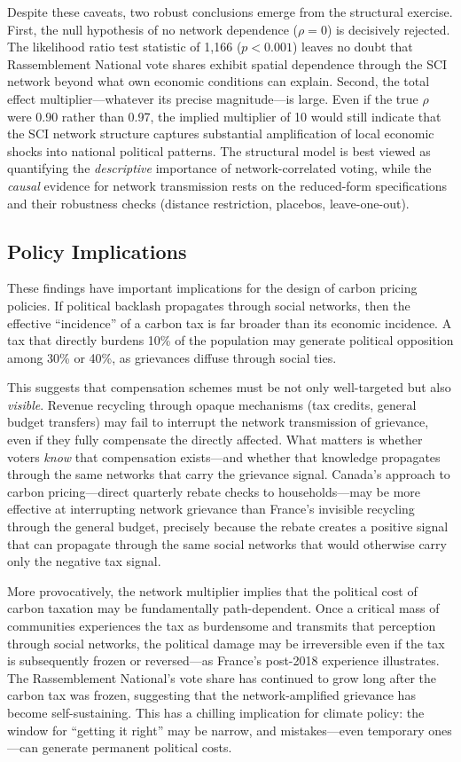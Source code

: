 \documentclass[12pt]{article}
\newcommand{\rn}{Rassemblement National}
\begin{document}
Despite these caveats, two robust conclusions emerge from the structural exercise. First, the null hypothesis of no network dependence ($\rho = 0$) is decisively rejected. The likelihood ratio test statistic of 1{,}166 ($p < 0.001$) leaves no doubt that \rn{} vote shares exhibit spatial dependence through the SCI network beyond what own economic conditions can explain. Second, the total effect multiplier---whatever its precise magnitude---is large. Even if the true $\rho$ were 0.90 rather than 0.97, the implied multiplier of 10 would still indicate that the SCI network structure captures substantial amplification of local economic shocks into national political patterns. The structural model is best viewed as quantifying the \textit{descriptive} importance of network-correlated voting, while the \textit{causal} evidence for network transmission rests on the reduced-form specifications and their robustness checks (distance restriction, placebos, leave-one-out).

\subsection{Policy Implications}

These findings have important implications for the design of carbon pricing policies. If political backlash propagates through social networks, then the effective ``incidence'' of a carbon tax is far broader than its economic incidence. A tax that directly burdens 10\% of the population may generate political opposition among 30\% or 40\%, as grievances diffuse through social ties.

This suggests that compensation schemes must be not only well-targeted but also \textit{visible}. Revenue recycling through opaque mechanisms (tax credits, general budget transfers) may fail to interrupt the network transmission of grievance, even if they fully compensate the directly affected. What matters is whether voters \textit{know} that compensation exists---and whether that knowledge propagates through the same networks that carry the grievance signal. Canada's approach to carbon pricing---direct quarterly rebate checks to households---may be more effective at interrupting network grievance than France's invisible recycling through the general budget, precisely because the rebate creates a positive signal that can propagate through the same social networks that would otherwise carry only the negative tax signal.

More provocatively, the network multiplier implies that the political cost of carbon taxation may be fundamentally path-dependent. Once a critical mass of communities experiences the tax as burdensome and transmits that perception through social networks, the political damage may be irreversible even if the tax is subsequently frozen or reversed---as France's post-2018 experience illustrates. The \rn{}'s vote share has continued to grow long after the carbon tax was frozen, suggesting that the network-amplified grievance has become self-sustaining. This has a chilling implication for climate policy: the window for ``getting it right'' may be narrow, and mistakes---even temporary ones---can generate permanent political costs.
\end{document}

